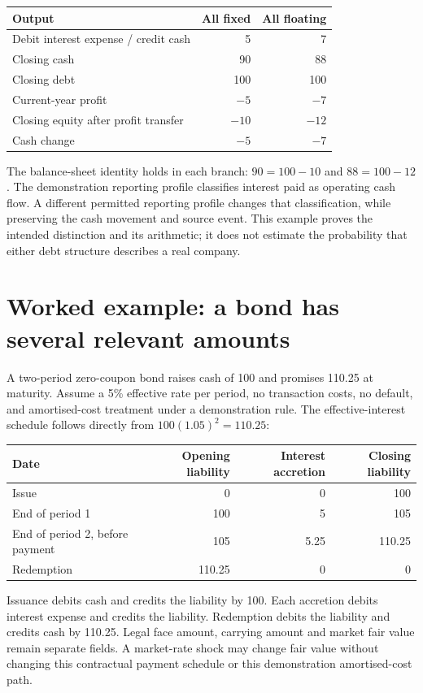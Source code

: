 \begin{center}
\begin{tabular}{lrr}
\toprule Output & All fixed & All floating\\\midrule
Debit interest expense / credit cash &5&7\\
Closing cash &90&88\\
Closing debt &100&100\\
Current-year profit & $-5$ & $-7$\\
Closing equity after profit transfer &$-10$&$-12$\\
Cash change &$-5$&$-7$\\\bottomrule
\end{tabular}
\end{center}
The balance-sheet identity holds in each branch: $90=100-10$ and
$88=100-12$. The demonstration reporting profile classifies interest paid as
operating cash flow. A different permitted reporting profile changes that
classification, while preserving the cash movement and source event. This
example proves the intended distinction and its arithmetic; it does not
estimate the probability that either debt structure describes a real company.

\section{Worked example: a bond has several relevant amounts}

A two-period zero-coupon bond raises cash of 100 and promises 110.25 at maturity.
Assume a 5\% effective rate per period, no transaction costs, no default, and
amortised-cost treatment under a demonstration rule. The effective-interest
schedule follows directly from $100(1.05)^2=110.25$:
\begin{center}
\begin{tabular}{lrrr}
\toprule Date & Opening liability & Interest accretion & Closing liability\\\midrule
Issue &0&0&100\\
End of period 1 &100&5&105\\
End of period 2, before payment &105&5.25&110.25\\
Redemption &110.25&0&0\\\bottomrule
\end{tabular}
\end{center}
Issuance debits cash and credits the liability by 100. Each accretion debits
interest expense and credits the liability. Redemption debits the liability
and credits cash by 110.25. Legal face amount, carrying amount and market
fair value remain separate fields. A market-rate shock may change fair value
without changing this contractual payment schedule or this demonstration
amortised-cost path.

